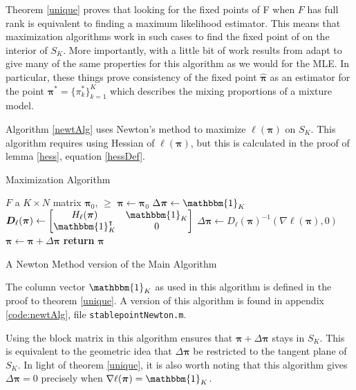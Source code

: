 \label{respMLE}

Theorem \ref{unique} proves that looking for the fixed points of \Rpi F when $F$ has full rank is equivalent to finding a maximum likelihood estimator. This means that maximization algorithms work in such cases to find the fixed point of  on the interior of $S_K$.  More importantly, with a little bit of work results from \citep{WaldMLE, pollard1981, pollard1982} adapt to give many of the same properties for this algorithm as we would for the MLE.  In particular, these things prove consistency of the fixed point $\hat{\bm\pi}$ as an estimator for the point $\bm\pi^\ast=\{\pi_k^\ast\}_{k=1}^{K}$ which describes the mixing proportions of a mixture model.

Algorithm \ref{newtAlg} uses Newton's method to maximize $\ell(\bm\pi)$ on $S_K$. This algorithm requires using Hessian of $\ell(\bm\pi)$, but this is calculated in the proof of lemma \ref{hess}, equation \eqref{hessDef}.

\begin{table}[h]
\begin{algorithm}[H]
\caption{Maximization Algorithm}\label{newtAlg}
\begin{algorithmic}
\Require $F$ a $K\times N$ matrix
\Require $\bm\pi_0$, $\ge$
	\State $\bm\pi \gets \bm\pi_0$
	\State $\Delta\bm\pi \gets \mathbbm{1}_K$
	\While{$\lVert\Delta\bm\pi\rVert>\ge\lVert\bm\pi\rVert$}
		\State $\bm D_{\ell}(\bm\pi) \gets \Matrix{H_{\ell}(\bm\pi)&\mathbbm{1}_K\\ \mathbbm{1}_K^{\intercal}& 0 }$
		\State $\Delta\bm\pi \gets D_{\ell}(\bm\pi)^{-1}(\nabla\ell(\bm\pi),0)$
		\State $\bm\pi \gets \bm\pi + \Delta\bm\pi$
	\EndWhile
	\State \textbf{return} $\bm\pi$ 
\EndProcedure
\end{algorithmic}
\end{algorithm}
\caption{A Newton Method version of the Main Algorithm}
\end{table}
The column vector $\mathbbm{1}_K$ as used in this algorithm is defined in the proof to theorem \ref{unique}.  A version of this algorithm is found in appendix \ref{code:newtAlg}, file \verb|stablepointNewton.m|.

Using the block matrix in this algorithm ensures that $\bm\pi+\Delta\bm\pi$ stays in $S_K$.  This is equivalent to the geometric idea that $\Delta\bm\pi$ be restricted to the tangent plane of $S_K$.  In light of theorem \ref{unique}, it is also worth noting that this algorithm gives $\Delta\bm\pi=0$ precisely when $\nabla\ell(\bm\pi)=\mathbbm{1}_K$.

